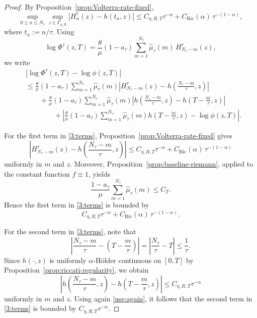 \documentclass[letterpaper]{article}
\numberwithin{equation}{section}
\theoremstyle{definition}
\theoremstyle{remark}
\begin{document}
\begin{proof}
By Proposition~\ref{prop:Volterra-rate-fixed},
\[
  \sup_{0\le n\le N_\tau}\sup_{z\in\Gamma_{\eta,R}}
  \left|H_n^\tau(z)-h(t_n,z)\right|
  \le
  C_{\eta,R,T}\tau^{-\alpha}+{C_{\mathrm{Ric}}(\alpha)}\,\tau^{-(1-\alpha)},
\]
where $t_n:=n/\tau$.
Using
\[
  \log\Phi^\tau(z,T)
  =
  \frac{\theta}{\mu}(1-a_\tau)
  \sum_{m=1}^{N_\tau}\hat\mu_\tau(m)\,H_{N_\tau-m}^\tau(z),
\]
we write
\begin{align}
  &\left|
    \log\Phi^\tau(z,T)-\log\phi(z,T)
  \right|
  \nonumber
  \\
  &\le
  \frac{\theta}{\mu}(1-a_\tau)
  \sum_{m=1}^{N_\tau}\hat\mu_\tau(m)
  \left|
    H_{N_\tau-m}^\tau(z)-h\!\left(\frac{N_\tau-m}{\tau},z\right)
  \right|
  \nonumber
  \\
  &\qquad
  +
  \frac{\theta}{\mu}(1-a_\tau)
  \sum_{m=1}^{N_\tau}\hat\mu_\tau(m)
  \left|
    h\!\left(\frac{N_\tau-m}{\tau},z\right)-h\!\left(T-\frac{m}{\tau},z\right)
  \right|
  \nonumber
  \\
  &\qquad\qquad
  +
  \left|
    \frac{\theta}{\mu}(1-a_\tau)
    \sum_{m=1}^{N_\tau}\hat\mu_\tau(m)
    h\!\left(T-\frac{m}{\tau},z\right)
    -
    \log\phi(z,T)
  \right|.\label{3:terms}
\end{align}

For the first term in \eqref{3:terms}, Proposition~\ref{prop:Volterra-rate-fixed} gives
\[
  \left|
    H_{N_\tau-m}^\tau(z)-h\!\left(\frac{N_\tau-m}{\tau},z\right)
  \right|
  \le
  C_{\eta,R,T}\tau^{-\alpha}+{C_{\mathrm{Ric}}(\alpha)}\,\tau^{-(1-\alpha)}
\]
uniformly in $m$ and $z$. Moreover, Proposition~\ref{prop:baseline-riemann},
applied to the constant function $f\equiv1$, yields
\begin{equation}\label{use:again}
  \frac{1-a_\tau}{\mu}\sum_{m=1}^{N_\tau}\hat\mu_\tau(m)\le C_T.
\end{equation}
Hence the first term in \eqref{3:terms} is bounded by
\[
  C_{\eta,R,T}\tau^{-\alpha}+{C_{\mathrm{Ric}}(\alpha)}\,\tau^{-(1-\alpha)}.
\]

For the second term in \eqref{3:terms}, note that
\[
  \left|
    \frac{N_\tau-m}{\tau}-\left(T-\frac{m}{\tau}\right)
  \right|
  =
  \left|\frac{N_\tau}{\tau}-T\right|
  \le \frac1\tau.
\]
Since $h(\cdot,z)$ is uniformly $\alpha$-H\"older continuous on $[0,T]$ by
Proposition~\ref{prop:riccati-regularity}, we obtain
\[
  \left|
    h\!\left(\frac{N_\tau-m}{\tau},z\right)-h\!\left(T-\frac{m}{\tau},z\right)
  \right|
  \le C_{\eta,R,T}\tau^{-\alpha}
\]
uniformly in $m$ and $z$. Using again \eqref{use:again},
it follows that the second term in \eqref{3:terms} is bounded by
$C_{\eta,R,T}\tau^{-\alpha}$.


\end{proof}
\end{document}
